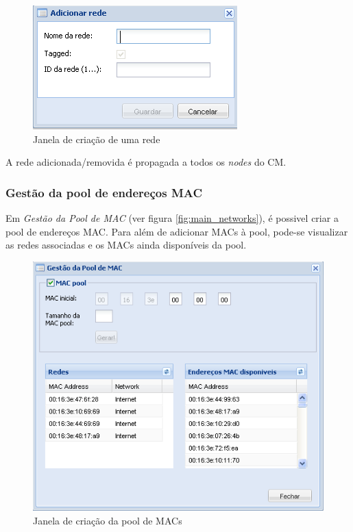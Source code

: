\begin{figure}[H]
	\begin{center}
	\includegraphics[scale=0.5]{screenshots/network_create.png}
	\caption{Janela de criação de uma rede}
	\label{fig:network_create}
	\end{center}
\end{figure}

A rede adicionada/removida é propagada a todos os \emph{nodes} do CM.


\subsubsection{Gestão da pool de endereços MAC}
\label{sec:mac_pool}

Em \emph{Gestão da Pool de MAC} (ver figura \ref{fig:main_networks}), é possivel criar a pool de endereços MAC.
Para além de adicionar MACs à pool, pode-se visualizar as redes associadas e os MACs ainda disponíveis da pool.

\begin{figure}[H]
	\begin{center}
	\includegraphics[scale=0.5]{screenshots/networks_macpool.png}
	\caption{Janela de criação da pool de MACs}
	\label{fig:networks_macpool}
	\end{center}
\end{figure}


